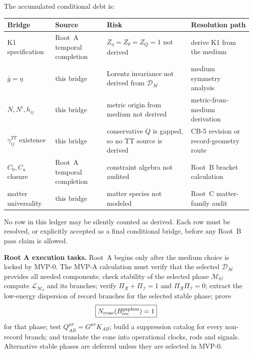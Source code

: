 \documentclass[11pt]{article}
\begin{document}
The accumulated conditional debt is:
\begin{center}
\begin{tabular}{p{}p{}p{}p{}}
\hline
\textbf{Bridge} & \textbf{Source} & \textbf{Risk} & \textbf{Resolution path}\\
\hline
K1 specification & Root~A temporal completion &
\(Z_\eta=Z_\theta=Z_Q=1\) not derived &
derive K1 from the medium\\
\(\bar g=\eta\) & this bridge &
Lorentz invariance not derived from \(\mathcal D_{\mathcal M}\) &
medium symmetry analysis\\
\(N,N^i,h_{ij}\) & this bridge &
metric origin from medium not derived &
metric-from-medium derivation\\
\(\gamma_{ij}^{TT}\) existence & this bridge &
conservative \(Q\) is gapped, so no TT source is derived &
CB-5 revision or record-geometry route\\
\(C_0,C_a\) closure & Root~A temporal completion &
constraint algebra not audited &
Root~B bracket calculation\\
matter universality & this bridge &
matter species not modeled &
Root~C matter-family audit\\
\hline
\end{tabular}
\end{center}
No row in this ledger may be silently counted as derived.  Each row must be
resolved, or explicitly accepted as a final conditional bridge, before any
Root~B pass claim is allowed.

\medskip\noindent\textbf{Root A execution tasks.}
Root~A begins only after the medium choice is locked by MVP-0.  The MVP-A
calculation must verify that the selected \(\mathcal D_{\mathcal M}\) provides
all needed components; check stability of the selected phase \(\mathcal M_0\);
compute \(\mathcal L_{\mathcal M_0}\) and its branches; verify
\(\Pi_{\mathcal R}+\Pi_{\mathcal I}=1\) and
\(\Pi_{\mathcal R}\Pi_{\mathcal I}=0\); extract the low-energy dispersion of
record branches for the selected stable phase; prove
\[
\boxed{N_{\rm cone}(B_{\rm rec}^{\rm gapless})=1}
\]
for that phase; test \(Q_{AB}^{\mu\nu}=G^{\mu\nu}K_{AB}\); build a
suppression catalog for every non-record branch; and translate the cone into
operational clocks, rods and signals.  Alternative stable phases are deferred
unless they are selected in MVP-0.
\end{document}
